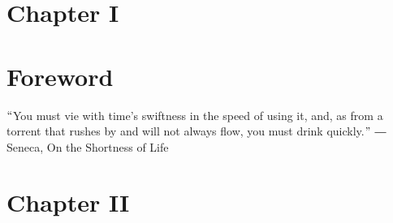 \documentclass[12pt]{report}
\begin{document}
\vspace{\baselineskip}

\vspace{\baselineskip}

\vspace{\baselineskip}

\vspace{\baselineskip}

\vspace{\baselineskip}

\vspace{\baselineskip}



\newpage

\vspace{\baselineskip}
\vspace{\baselineskip}
\section*{Chapter I}
\section*{Foreword}

\vspace{\baselineskip}
$``$You must vie with time’s swiftness in the speed of using it, and, as from a torrent that rushes by and will not always flow, you must drink quickly.$"$  ― Seneca, On the Shortness of Life\par


\vspace{\baselineskip}

\vspace{\baselineskip}

\vspace{\baselineskip}



\newpage

\vspace{\baselineskip}
\vspace{\baselineskip}
\section*{Chapter II}
\end{document}
